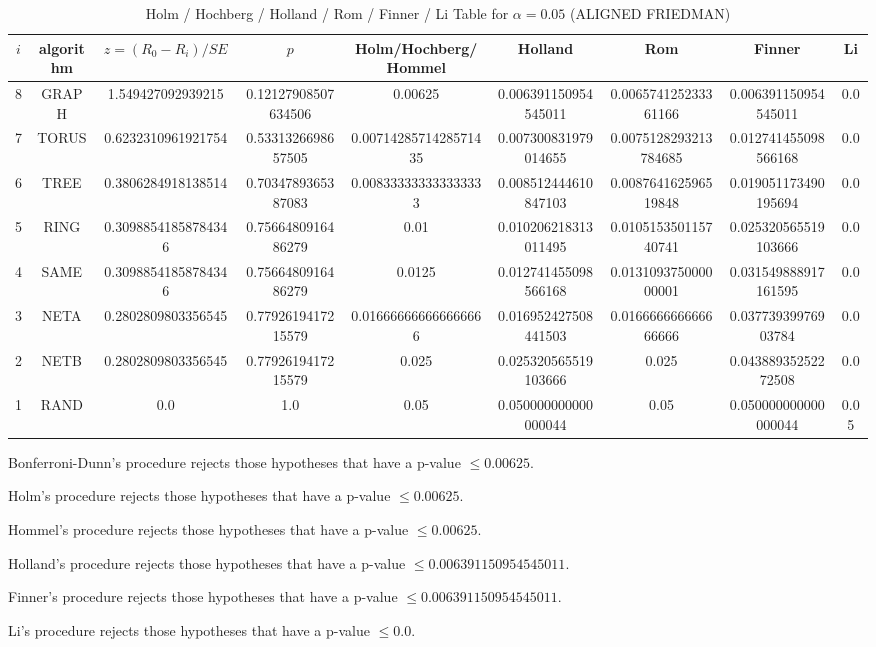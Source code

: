 \documentclass[a4paper,10pt]{article}
\begin{document}
\begin{landscape}
\newpage

\begin{table}[!htp]
\centering\scriptsize
\caption{Holm / Hochberg / Holland / Rom / Finner / Li Table for $\alpha=0.05$ (ALIGNED FRIEDMAN)}
\begin{tabular}{ccccccccc}
$i$&algorithm&$z=(R_0 - R_i)/SE$&$p$&Holm/Hochberg/Hommel&Holland&Rom&Finner&Li\\
\hline
8& GRAPH&1.549427092939215&0.12127908507634506&0.00625&0.006391150954545011&0.006574125233361166&0.006391150954545011&0.0\\
7& TORUS&0.6232310961921754&0.5331326698657505&0.0071428571428571435&0.007300831979014655&0.0075128293213784685&0.012741455098566168&0.0\\
6& TREE&0.3806284918138514&0.7034789365387083&0.008333333333333333&0.008512444610847103&0.008764162596519848&0.019051173490195694&0.0\\
5& RING&0.30988541858784346&0.7566480916486279&0.01&0.010206218313011495&0.010515350115740741&0.025320565519103666&0.0\\
4& SAME&0.30988541858784346&0.7566480916486279&0.0125&0.012741455098566168&0.013109375000000001&0.031549888917161595&0.0\\
3& NETA&0.2802809803356545&0.7792619417215579&0.016666666666666666&0.016952427508441503&0.016666666666666666&0.03773939976903784&0.0\\
2& NETB&0.2802809803356545&0.7792619417215579&0.025&0.025320565519103666&0.025&0.04388935252272508&0.0\\
1& RAND&0.0&1.0&0.05&0.050000000000000044&0.05&0.050000000000000044&0.05\\
\hline
\end{tabular}
\end{table}
Bonferroni-Dunn's procedure rejects those hypotheses that have a p-value $\le0.00625$.


Holm's procedure rejects those hypotheses that have a p-value $\le0.00625$.


Hommel's procedure rejects those hypotheses that have a p-value $\le0.00625$.


Holland's procedure rejects those hypotheses that have a p-value $\le0.006391150954545011$.


Finner's procedure rejects those hypotheses that have a p-value $\le0.006391150954545011$.


Li's procedure rejects those hypotheses that have a p-value $\le0.0$.




\end{landscape}
\end{document}
